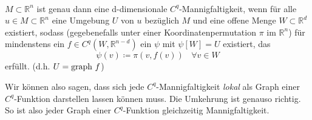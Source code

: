 \begin{satz}
\mbox{} \\
$M \subset \mathbb{R}^{n}$ ist genau dann eine d-dimensionale $C^{q}$-Mannigfaltigkeit, wenn für alle $u\in M\subset\mathbb{R}^n$ eine Umgebung $U$ von $u$ bezüglich $M$ und eine offene Menge $W\subset\mathbb{R}^d$ existiert, sodass (gegebenefalls unter einer Koordinatenpermutation $\pi$ im $\mathbb{R}^n$) für mindenstens ein $f \in C^q (W, \mathbb{R}^{n-d})$ ein $\psi$ mit $\psi[W]=U$ existiert, das
\begin{equation*}
\psi(v)\coloneqq\pi(v,f(v)) \ \ \ \ \forall v\in W
\end{equation*}
erfüllt. (d.h. $U=\text{graph\ } f$)

\end{satz}

Wir können also sagen, dass sich jede $C^q$-Mannigfaltigkeit \emph{lokal} als Graph einer $C^q$-Funktion darstellen lassen können muss. Die Umkehrung ist genauso richtig. So ist also jeder Graph einer $C^q$-Funktion gleichzeitig Mannigfaltigkeit.

